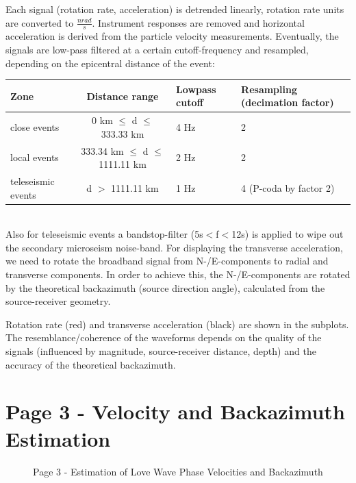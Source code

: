 \documentclass[a4paper,10pt]{article}
\begin{document}
Each signal (rotation rate, acceleration) is detrended linearly, rotation rate units are converted to $\frac{nrad}{s}$. Instrument responses are removed and horizontal acceleration is derived from the particle velocity measurements. Eventually, the signals are low-pass filtered at a certain cutoff-frequency and resampled, depending on the epicentral distance of the event:
\\

\begin{tabular}{l|c|l|l}
	\textbf{Zone} & \textbf{Distance range} &\textbf{ Lowpass cutoff}& \textbf{Resampling (decimation factor)}\\
	\hline
	close events & 0 km $\le$ d $\le$ 333.33 km & 4 Hz & 2 \\
	\hline
	local events & 333.34 km $\le$ d $\le$ 1111.11 km & 2 Hz & 2\\
	\hline
	teleseismic events & d $>$ 1111.11 km & 1 Hz & 4 (P-coda by factor 2)
\end{tabular}
\vspace{.5cm}\\
Also for teleseismic events a bandstop-filter (5s$<$f$<$12s) is applied to wipe out the secondary microseism noise-band. For  displaying  the  transverse  acceleration,  we  need  to  rotate  the  broadband  signal  from  N-/E-components to  radial  and  transverse  components.   In  order  to  achieve  this,  the  N-/E-components  are  rotated  by  the theoretical backazimuth (source direction angle), calculated from the  source-receiver geometry.

Rotation rate (red) and transverse acceleration (black) are shown in the subplots.  The resemblance/coherence of the waveforms depends on the quality of the signals (influenced by magnitude, source-receiver distance, depth) and the accuracy of the theoretical backazimuth.

\newpage
\section*{Page 3 - Velocity and Backazimuth Estimation}

\begin{figure}[h!]
\centering
 \caption{Page 3 - Estimation of Love Wave Phase Velocities and Backazimuth }
 \label{page3}
\end{figure}
\end{document}
